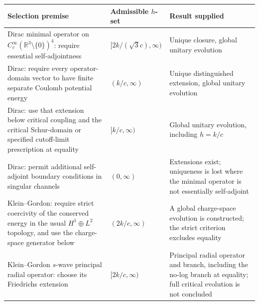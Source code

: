 \documentclass[11pt,a4paper]{article}
\begin{document}
\begin{longtable}[]{@{}
  >{\raggedright\arraybackslash}p{}
  >{\raggedright\arraybackslash}p{}
  >{\raggedright\arraybackslash}p{}@{}}
\toprule\noalign{}
\begin{minipage}[b]{\linewidth}\raggedright
Selection premise
\end{minipage} & \begin{minipage}[b]{\linewidth}\raggedright
Admissible \(h\)-set
\end{minipage} & \begin{minipage}[b]{\linewidth}\raggedright
Result supplied
\end{minipage} \\
\midrule\noalign{}
\endhead
\bottomrule\noalign{}
\endlastfoot
Dirac minimal operator on \(C_c^\infty(\mathbb R^3\setminus\{0\})^4\):
require essential self-adjointness & \([2k/(\sqrt3c),\infty)\) & Unique
closure, global unitary evolution \\
Dirac: require every operator-domain vector to have finite separate
Coulomb potential energy & \((k/c,\infty)\) & Unique distinguished
extension, global unitary evolution \\
Dirac: use that extension below critical coupling and the critical
Schur-domain or specified cutoff-limit prescription at equality &
\([k/c,\infty)\) & Global unitary evolution, including \(h=k/c\) \\
Dirac: permit additional self-adjoint boundary conditions in singular
channels & \((0,\infty)\) & Extensions exist; uniqueness is lost where
the minimal operator is not essentially self-adjoint \\
Klein--Gordon: require strict coercivity of the conserved energy in the
usual \(H^1\oplus L^2\) topology, and use the charge-space generator
below & \((2k/c,\infty)\) & A global charge-space evolution is
constructed; the strict criterion excludes equality \\
Klein--Gordon \(s\)-wave principal radial operator: choose its
Friedrichs extension & \([2k/c,\infty)\) & Principal radial operator and
branch, including the no-log branch at equality; full critical evolution
is not concluded \\
\end{longtable}
\end{document}
